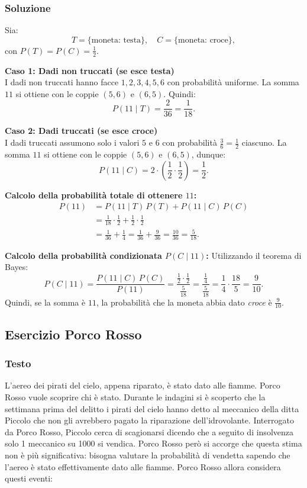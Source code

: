 \subsubsection{Soluzione}
Sia:
\[
T = \{\text{moneta: testa}\}, \quad C = \{\text{moneta: croce}\},
\]
con \(P(T)=P(C)=\frac{1}{2}\).

\textbf{Caso 1: Dadi non truccati (se esce testa)}\\[1mm]
I dadi non truccati hanno facce \(1,2,3,4,5,6\) con probabilità uniforme. La somma \(11\) si ottiene con le coppie \((5,6)\) e \((6,5)\). Quindi:
\[
P(11 \mid T) = \frac{2}{36} = \frac{1}{18}.
\]

\textbf{Caso 2: Dadi truccati (se esce croce)}\\[1mm]
I dadi truccati assumono solo i valori \(5\) e \(6\) con probabilità \( \frac{3}{6} = \frac{1}{2}\) ciascuno. La somma \(11\) si ottiene con le coppie \((5,6)\) e \((6,5)\), dunque:
\[
P(11 \mid C) = 2 \cdot \left(\frac{1}{2} \cdot \frac{1}{2}\right) = \frac{1}{2}.
\]

\textbf{Calcolo della probabilità totale di ottenere \(11\):}
\[
\begin{split}
P(11) &= P(11 \mid T) \, P(T) + P(11 \mid C) \, P(C) \\
&= \frac{1}{18} \cdot \frac{1}{2} + \frac{1}{2} \cdot \frac{1}{2} \\
&= \frac{1}{36} + \frac{1}{4} = \frac{1}{36} + \frac{9}{36} = \frac{10}{36} = \frac{5}{18}.
\end{split}
\]

\textbf{Calcolo della probabilità condizionata \(P(C \mid 11)\):}
Utilizzando il teorema di Bayes:
\[
P(C \mid 11) = \frac{P(11 \mid C) \, P(C)}{P(11)} 
= \frac{\frac{1}{2} \cdot \frac{1}{2}}{\frac{5}{18}} 
= \frac{\frac{1}{4}}{\frac{5}{18}} 
= \frac{1}{4} \cdot \frac{18}{5} 
= \frac{9}{10}.
\]
Quindi, se la somma è \(11\), la probabilità che la moneta abbia dato \emph{croce} è \(\frac{9}{10}\).



\subsection{Esercizio Porco Rosso}
\subsubsection{Testo}



L’aereo dei pirati del cielo, appena riparato, è stato dato alle fiamme. Porco Rosso vuole scoprire chi è stato. Durante le indagini si è scoperto che la settimana prima del delitto i pirati del cielo hanno detto al meccanico della ditta Piccolo che non gli avrebbero pagato la riparazione dell’idrovolante. Interrogato da Porco Rosso, Piccolo cerca di scagionarsi dicendo che a seguito di insolvenza solo 1 meccanico su 1000 si vendica. Porco Rosso però si accorge che questa stima non è più significativa: bisogna valutare la probabilità di vendetta sapendo che l’aereo è stato effettivamente dato alle fiamme. Porco Rosso allora considera questi eventi:

